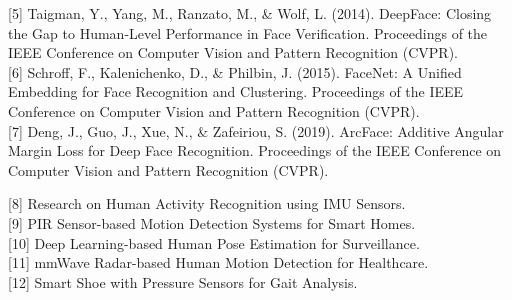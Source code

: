 \documentclass[journal]{IEEEtran}
\begin{document}
[5] Taigman, Y., Yang, M., Ranzato, M., \& Wolf, L. (2014). DeepFace: Closing the Gap to Human-Level Performance in Face Verification. Proceedings of the IEEE Conference on Computer Vision and Pattern Recognition (CVPR).\\

[6] Schroff, F., Kalenichenko, D., \& Philbin, J. (2015). FaceNet: A Unified Embedding for Face Recognition and Clustering. Proceedings of the IEEE Conference on Computer Vision and Pattern Recognition (CVPR).\\

[7] Deng, J., Guo, J., Xue, N., \& Zafeiriou, S. (2019). ArcFace: Additive Angular Margin Loss for Deep Face Recognition. Proceedings of the IEEE Conference on Computer Vision and Pattern Recognition (CVPR).

[8] Research on Human Activity Recognition using IMU Sensors.\\

[9] PIR Sensor-based Motion Detection Systems for Smart Homes.\\

[10] Deep Learning-based Human Pose Estimation for Surveillance.\\

[11] mmWave Radar-based Human Motion Detection for Healthcare.\\

[12] Smart Shoe with Pressure Sensors for Gait Analysis.
\end{document}
